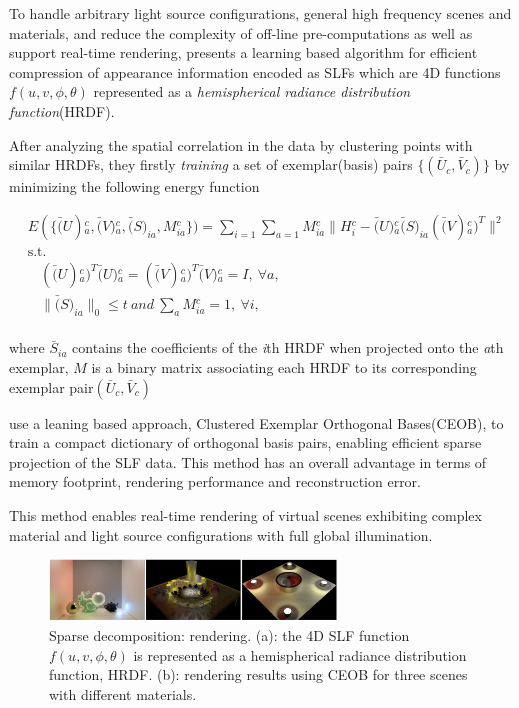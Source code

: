 To handle arbitrary light source configurations, general high frequency scenes and materials,
and reduce the complexity of off-line pre-computations as well as support real-time rendering,
\cite{miandji2013learning} presents a learning based algorithm for efficient compression of appearance information encoded as SLFs
which are 4D functions$f(u,v,\phi,\theta)$ represented as a \textit{hemispherical radiance distribution function}(HRDF).

After analyzing the spatial correlation in the data by clustering points with similar HRDFs,
they firstly \textit{training} a set of exemplar(basis) pairs $\{(\bar{U}_{c},\bar{V}_c)\}$ by minimizing the following energy function

\small{
\begin{equation}
 \label{eq:L1reconstruction}
 \begin{aligned}
 & E(\{\bar(U){_{a}^{c}}, \bar(V){_{a}^{c}}, \bar(S)_{ia}, M{_{ia}^{c}}\})=
   \sum_{i=1}^{} \sum_{a=1}^{}
   M{_{ia}^{c}}
   \| H{_{i}^{c}} - \bar(U){_{a}^{c}} \bar(S)_{ia} (\bar(V){_{a}^{c}})^{T}\|^2 \\
 &\mathrm{s.t.} \\
 &~~~~  (\bar(U){_{a}^{c}})^{T} \bar(U){_{a}^{c}} = (\bar(V){_{a}^{c}})^{T} \bar(V){_{a}^{c}} = I,~\forall a,\\
 &~~~~  \| \bar(S)_{ia} \|_0 \le t ~and~ \sum_{a}^{} M{_{ia}^{c}}=1,~\forall i,
 \end{aligned}
\end{equation}
}
\\
where $\bar{S}_{ia}$ contains the coefficients of the \textit{i}th HRDF when projected onto the \textit{a}th exemplar, $M$ is a binary matrix associating each HRDF to its corresponding exemplar pair$(\bar{U}_{c},\bar{V}_c)$


use a leaning based approach, Clustered Exemplar Orthogonal Bases(CEOB), to train a compact dictionary of orthogonal basis pairs, enabling efficient sparse projection of the SLF data. This method has an overall advantage in terms of memory footprint, rendering performance and reconstruction error.



This method enables real-time rendering of virtual scenes exhibiting complex material and light source configurations with full global illumination.

\begin{figure}[ht]
  \centering
  \includegraphics[width=3in]{images/rendering_learning}
  \caption{Sparse decomposition: rendering\cite{miandji2013learning}. (a): the 4D SLF function $f(u,v,\phi,\theta)$ is represented as a hemispherical radiance distribution function, HRDF. (b): rendering results using CEOB for three scenes with different materials.}
\end{figure} 